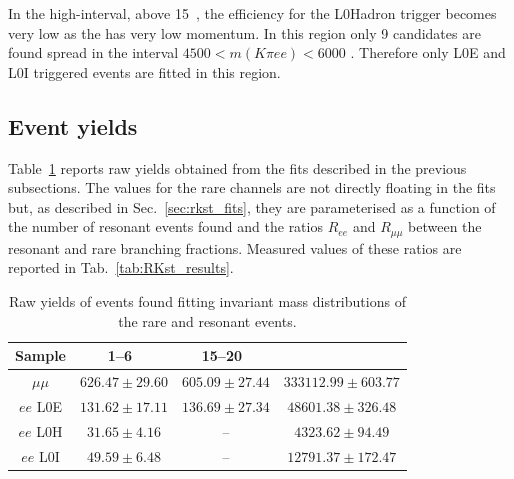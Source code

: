 In the high-\qsq interval, above 15~\gevgevcccc, the efficiency for the
L0Hadron trigger becomes very low as the \Kstar has very low momentum.
In this region only 9 candidates are found spread in the interval
$4500 < m(K\pi ee) < 6000$ \mevcc. Therefore
only L0E and L0I triggered events are fitted in this region.

\subsection{Event yields}

Table~\ref{tab:RKst_yields} reports raw yields obtained from the
fits described in the previous subsections. The values for the rare channels are not
directly floating in the fits but, as described in Sec.~\ref{sec:rkst_fits}, they are parameterised
as a function of the number of resonant events found and the ratios $R_{ee}$ and $R_{\mu\mu}$
between the resonant and rare branching fractions. Measured values of these ratios are reported 
in Tab.~\ref{tab:RKst_results}.

\begin{table}
\centering
\begin{tabular}{|c|c|c|c|}
\hline
 Sample 			& 1--6~\gevgevcccc 			& 15--20~\gevgevcccc 		& \jpsi  \\ \hline
$\mu\mu$ 		& $ 626.47  \pm 29.60  $ 		& $ 605.09  \pm 27.44 $ 		& $ 333112.99  \pm 603.77 $ \\
$ee$ L0E 			& $ 131.62   \pm  17.11$   	& $ 136.69  \pm 27.34 $ 		& $ 48601.38  \pm 326.48 $ \\
$ee$ L0H 			& $ 31.65   \pm  4.16$ 		& 			-- 			& $ 4323.62  \pm 94.49 $ \\
$ee$ L0I 			& $ 49.59   \pm  6.48$ 		& 			-- 			& $ 12791.37  \pm 172.47 $ \\
\hline
 \end{tabular}
\caption{Raw yields of events found fitting invariant mass distributions of the rare and resonant events. }
\label{tab:RKst_yields}
\end{table}


